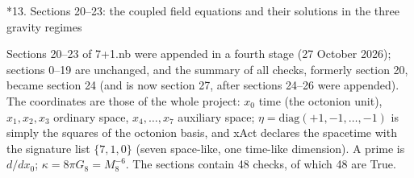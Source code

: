 \documentclass[10pt,a4paper]{article}
\makeatletter
\renewcommand\section{\@startsection{section}{1}{\z@}{-3.5ex \@plus -1ex \@minus -.2ex}{2.3ex \@plus.2ex}{\normalfont\Large\bfseries\raggedright}}
\makeatother
\begin{document}
\section*{13. Sections 20–23: the coupled field equations and their solutions in the three gravity regimes}
Sections 20–23 of 7+1.nb were appended in a fourth stage (27 October 2026); sections 0–19 are unchanged, and the summary of all checks, formerly section 20, became section 24 (and is now section 27, after sections 24–26 were appended). The coordinates are those of the whole project: $x_0$ time (the octonion unit), $x_1,x_2,x_3$ ordinary space, $x_4,\dots,x_7$ auxiliary space; $\eta=\mathrm{diag}(+1,-1,\dots,-1)$ is simply the squares of the octonion basis, and xAct declares the spacetime with the signature list $\{7,1,0\}$ (seven space-like, one time-like dimension). A prime is $d/dx_0$; $\kappa=8\pi G_8=M_8^{-6}$. The sections contain 48 checks, of which 48 are True.
\end{document}
